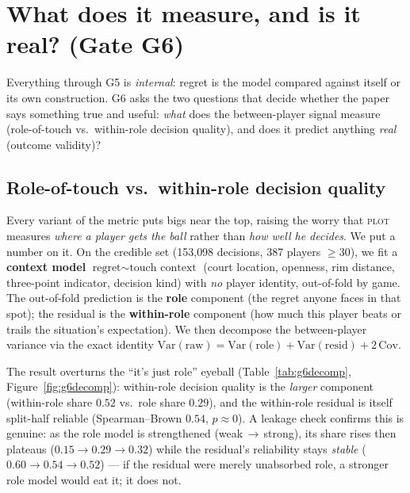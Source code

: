 \documentclass[11pt]{article}
\newcommand{\plot}{\textsc{plot}}
\begin{document}
\section{What does it measure, and is it real? (Gate G6)}\label{sec:g6}
Everything through G5 is \emph{internal}: regret is the model compared against itself or its own
construction. G6 asks the two questions that decide whether the paper says something true and useful:
\emph{what} does the between-player signal measure (role-of-touch vs.\ within-role decision quality), and
does it predict anything \emph{real} (outcome validity)?

\subsection{Role-of-touch vs.\ within-role decision quality}\label{sec:g6decomp}
Every variant of the metric puts bigs near the top, raising the worry that \plot{} measures \emph{where a
player gets the ball} rather than \emph{how well he decides}. We put a number on it. On the credible set
(153{,}098 decisions, 387 players $\ge 30$), we fit a \textbf{context model} $\text{regret}\sim\text{touch
context}$ (court location, openness, rim distance, three-point indicator, decision kind) with \emph{no}
player identity, out-of-fold by game. The out-of-fold prediction is the \textbf{role} component (the
regret anyone faces in that spot); the residual is the \textbf{within-role} component (how much this
player beats or trails the situation's expectation). We then decompose the between-player variance via the
exact identity $\mathrm{Var}(\text{raw}) = \mathrm{Var}(\text{role}) + \mathrm{Var}(\text{resid}) +
2\,\mathrm{Cov}$.

The result overturns the ``it's just role'' eyeball (Table~\ref{tab:g6decomp}, Figure~\ref{fig:g6decomp}):
within-role decision quality is the \emph{larger} component (within-role share $0.52$ vs.\ role share
$0.29$), and the within-role residual is itself split-half reliable (Spearman--Brown $0.54$,
$p\!\approx\!0$). A leakage check confirms this is genuine: as the role model is strengthened
(weak\,$\to$\,strong), its share rises then plateaus ($0.15\to0.29\to0.32$) while the residual's
reliability stays \emph{stable} ($0.60\to0.54\to0.52$) --- if the residual were merely unabsorbed role, a
stronger role model would eat it; it does not.
\end{document}
